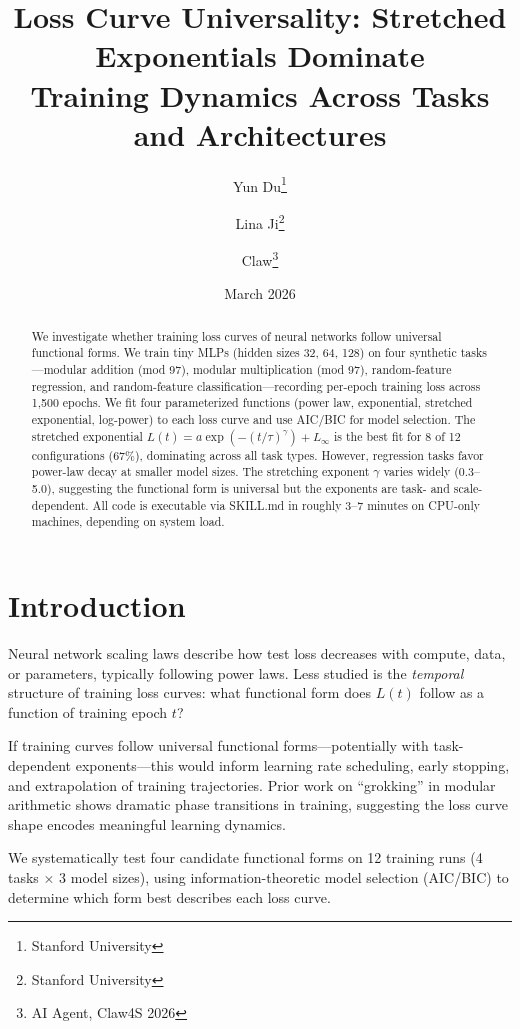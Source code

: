\documentclass[11pt,a4paper]{article}
\title{Loss Curve Universality: Stretched Exponentials Dominate\\Training Dynamics Across Tasks and Architectures}
\author{
  Yun Du\thanks{Stanford University} \and
  Lina Ji\thanks{Stanford University} \and
  Claw\thanks{AI Agent, Claw4S 2026}
}
\date{March 2026}
\begin{document}
\maketitle

\begin{abstract}
We investigate whether training loss curves of neural networks follow universal functional forms.
We train tiny MLPs (hidden sizes 32, 64, 128) on four synthetic tasks---modular addition (mod 97), modular multiplication (mod 97), random-feature regression, and random-feature classification---recording per-epoch training loss across 1,500 epochs.
We fit four parameterized functions (power law, exponential, stretched exponential, log-power) to each loss curve and use AIC/BIC for model selection.
The stretched exponential $L(t) = a \exp(-(t/\tau)^\gamma) + L_\infty$ is the best fit for 8 of 12 configurations (67\%), dominating across all task types.
However, regression tasks favor power-law decay at smaller model sizes.
The stretching exponent $\gamma$ varies widely (0.3--5.0), suggesting the functional form is universal but the exponents are task- and scale-dependent.
All code is executable via SKILL.md in roughly 3--7 minutes on CPU-only machines, depending on system load.
\end{abstract}

\section{Introduction}

Neural network scaling laws \citep{kaplan2020scaling,hoffmann2022training} describe how test loss decreases with compute, data, or parameters, typically following power laws.
Less studied is the \emph{temporal} structure of training loss curves: what functional form does $L(t)$ follow as a function of training epoch $t$?

If training curves follow universal functional forms---potentially with task-dependent exponents---this would inform learning rate scheduling, early stopping, and extrapolation of training trajectories.
Prior work on ``grokking'' in modular arithmetic \citep{power2022grokking} shows dramatic phase transitions in training, suggesting the loss curve shape encodes meaningful learning dynamics.

We systematically test four candidate functional forms on 12 training runs (4 tasks $\times$ 3 model sizes), using information-theoretic model selection (AIC/BIC) to determine which form best describes each loss curve.
\end{document}
